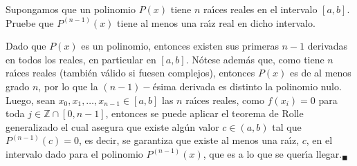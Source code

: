 \begin{enunciado}
 Supongamos que un polinomio $P(x)$ tiene $n$ ra\'{\i}ces reales en el intervalo $[a,b]$. Pruebe que $P^{(n-1)}(x)$ tiene al menos una ra\'{\i}z real en dicho intervalo.
\end{enunciado}

\begin{solucion}
 Dado que $P(x)$ es un polinomio, entonces existen sus primeras $n-1$ derivadas en todos los reales, en particular en $[a,b]$. N\'otese adem\'as que, como tiene $n$ ra\'{\i}ces reales (tambi\'en v\'alido si fuesen complejos), entonces $P(x)$ es de al menos grado $n$, por lo que la $(n-1)-$\'esima derivada es distinto la polinomio nulo. Luego, sean $x_0, x_1, \ldots, x_{n-1} \in [a,b]$ las $n$ ra\'{\i}ces reales, como $f(x_i) = 0$ para toda $j \in \mathbb{Z}\cap[0,n-1]$, entonces se puede aplicar el teorema de Rolle generalizado el cual asegura que existe alg\'un valor $c\in (a,b)$ tal que $P^{(n-1)}(c) = 0$, es decir, se garantiza que existe al menos una ra\'{\i}z, $c$, en el intervalo dado para el polinomio $P^{(n-1)}(x)$, que es a lo que se quer\'{\i}a llegar.${}_{\blacksquare}$
\end{solucion}
